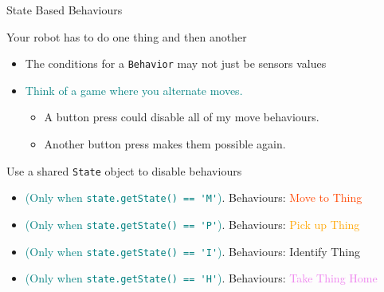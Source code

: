 \documentclass[color=pdftex,usenames,dvipsnames, aspectratio=169]{beamer}
\begin{document}
\begin{frame}{State Based Behaviours}
\begin{block}{Your robot has to do one thing and then another}
\begin{itemize}
\item The conditions for a \lstinline!Behavior! may not just be sensors values
\item \textcolor{teal}{Think of a game where you alternate moves.}
\begin{itemize}
\item \textcolor{RedOrange}{A button press could disable all of my move behaviours.}
\item \textcolor{OliveGreen}{Another button press makes them possible again.}
\end{itemize}
\end{itemize}
\end{block}
\begin{block}{Use a shared \lstinline[identifierstyle=\bfseries\color{yellow}]!State! object to disable behaviours}
\begin{itemize}
\item \textcolor{teal}{(Only when \lstinline!state.getState() == 'M'!)}. Behaviours: \textcolor{OrangeRed}{Move to Thing}
\item \textcolor{teal}{(Only when \lstinline!state.getState() == 'P'!)}. Behaviours: \textcolor{Orange}{Pick up Thing}
\item \textcolor{teal}{(Only when \lstinline!state.getState() == 'I'!)}. Behaviours: \textcolor{OliveGreen}{Identify Thing}
\item \textcolor{teal}{(Only when \lstinline!state.getState() == 'H'!)}. Behaviours: \textcolor{violet}{Take Thing Home}
\end{itemize}
\end{block}
\end{frame}
\end{document}
